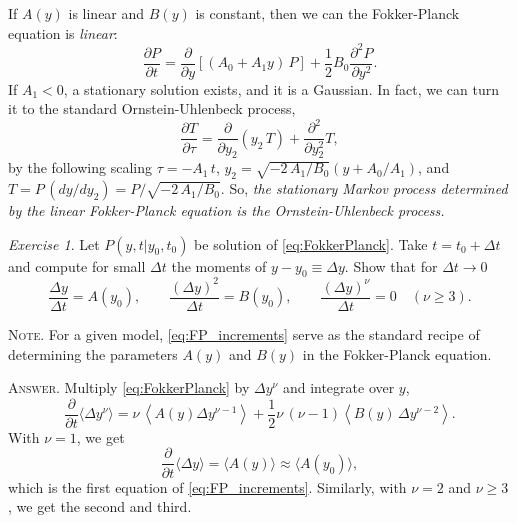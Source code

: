 \documentclass{book}
\numberwithin{equation}{section}
\theoremstyle{plain}
\theoremstyle{definition}
\theoremstyle{remark}
\theoremstyle{BoldStyle}
\newtheorem{exercise}{Exercise}
\numberwithin{exercise}{section}
\newcommand{\note}[1]{{\color{DarkGreen}\footnotesize \textsc{Note.} #1}}
\newcommand{\answer}[1]{{\color{DarkBlue}\footnotesize \textsc{Answer.} #1}}
\begin{document}
If $A(y)$ is linear and $B(y)$ is constant,
then we can the Fokker-Planck equation is \emph{linear}:
%
\begin{equation}
  \frac{ \partial P } { \partial t }
  =
  \frac{ \partial } { \partial y }
  \left[
    (A_0 + A_1 y) \, P
  \right]
  +
  \frac{1}{2} B_0
  \frac{ \partial^2 P } { \partial y^2 }.
  \label{eq:FP_linear}
\end{equation}
%
If $A_1 < 0$,
a stationary solution exists,
and it is a Gaussian.
%
In fact,
we can turn it to the standard Ornstein-Uhlenbeck process,
%
\begin{equation}
  \frac{ \partial T }{ \partial \tau }
  =
  \frac{ \partial } { \partial y_2 }
  ( y_2 \, T )
  +
  \frac{ \partial^2 } { \partial y_2^2 } T,
  \tag{IV.3.20}
\end{equation}
%
by the following scaling
$\tau = -A_1 \, t$,
$y_2 = \sqrt{-2 \, A_1/B_0} \left(y + A_0/A_1\right)$,
and
$T = P \, (dy/dy_2) = P / \sqrt{-2 \, A_1/B_0}$.
%
So,
\emph{
  the stationary Markov process determined by
  the linear Fokker-Planck equation
  is the Ornstein-Uhlenbeck process.
}

\begin{exercise}
  Let $P(y, t|y_0, t_0)$ be solution of \eqref{eq:FokkerPlanck}.
  Take $t = t_0 + \Delta t$ and compute for small $\Delta t$
  the moments of $y - y_0 \equiv \Delta y$.
  Show that for $\Delta t \to 0$
  \begin{equation}
    \frac{ \Delta y } { \Delta t }
    =
    A( y_0 ),
    \qquad
    \frac{ (\Delta y)^2 } { \Delta t }
    =
    B( y_0 ),
    \qquad
    \frac{ (\Delta y)^\nu } { \Delta t }
    =
    0 \quad (\nu \ge 3).
    \label{eq:FP_increments}
  \end{equation}

  \note{For a given model,
    \eqref{eq:FP_increments}
    serve as the standard recipe of determining
    the parameters $A(y)$ and $B(y)$
    in the Fokker-Planck equation.
  }

  \answer{
    Multiply \eqref{eq:FokkerPlanck}
    by $\Delta y^\nu$ and integrate over $y$,
    $$
    \frac{ \partial } { \partial t } \langle \Delta y^\nu \rangle
    =
    \nu \, \left\langle A(y) \Delta y^{\nu - 1} \right\rangle
    +
    \frac{1}{2} \nu \, (\nu - 1)
    \left\langle B(y) \, \Delta y^{\nu - 2} \right\rangle.
    $$
    With $\nu = 1$, we get
    $$
    \frac{ \partial } { \partial t } \langle \Delta y \rangle
    =
    \langle A(y) \rangle
    \approx
    \langle A(y_0) \rangle,
    $$
    which is the first equation of \eqref{eq:FP_increments}.
    Similarly, with $\nu = 2$ and $\nu \ge 3$,
    we get the second and third.
  }
\end{exercise}
\end{document}
